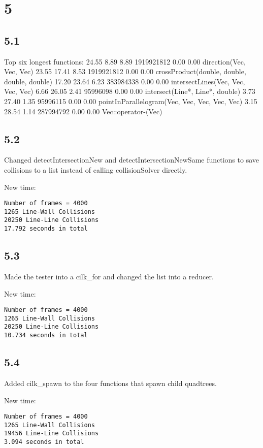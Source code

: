 \documentclass[12pt]{article}
\begin{document}
\section{5}
\subsection{5.1}
Top six longest functions:
  24.55      8.89     8.89 1919921812     0.00     0.00  direction(Vec, Vec, Vec)
  23.55     17.41     8.53 1919921812     0.00     0.00  crossProduct(double, double, double, double)
  17.20     23.64     6.23 383984338     0.00     0.00  intersectLines(Vec, Vec, Vec, Vec)
   6.66     26.05     2.41 95996098     0.00     0.00  intersect(Line*, Line*, double)
   3.73     27.40     1.35 95996115     0.00     0.00  pointInParallelogram(Vec, Vec, Vec, Vec, Vec)
   3.15     28.54     1.14 287994792     0.00     0.00  Vec::operator-(Vec)


\subsection{5.2}
Changed detectIntersectionNew and detectIntersectionNewSame functions to save 
collisions to a list instead of calling collisionSolver directly.  

New time:
\begin{verbatim}
Number of frames = 4000
1265 Line-Wall Collisions
20250 Line-Line Collisions
17.792 seconds in total
\end{verbatim}


\subsection{5.3}
Made the tester into a cilk_for and changed the list into a reducer.  

New time:
\begin{verbatim}
Number of frames = 4000
1265 Line-Wall Collisions
20250 Line-Line Collisions
10.734 seconds in total
\end{verbatim}


\subsection{5.4}
Added cilk_spawn to the four functions that spawn child quadtrees.  

New time:
\begin{verbatim}
Number of frames = 4000
1265 Line-Wall Collisions
19456 Line-Line Collisions
3.094 seconds in total
\end{verbatim}
\end{document}
